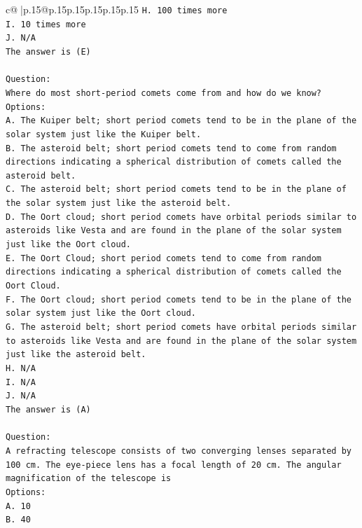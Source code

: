 \documentclass{article}
\begin{document}
{\begin{supertabular}{c@{$\;$}|p{.15\linewidth}@{}p{.15\linewidth}p{.15\linewidth}p{.15\linewidth}p{.15\linewidth}p{.15\linewidth}}
{{{\texttt{H. 100 times more} \\
\texttt{I. 10 times more} \\
\texttt{J. N/A} \\
\texttt{The answer is (E)} \\
\\ 
\texttt{Question:} \\
\texttt{Where do most short{-}period comets come from and how do we know?} \\
\texttt{Options:} \\
\texttt{A. The Kuiper belt; short period comets tend to be in the plane of the solar system just like the Kuiper belt.} \\
\texttt{B. The asteroid belt; short period comets tend to come from random directions indicating a spherical distribution of comets called the asteroid belt.} \\
\texttt{C. The asteroid belt; short period comets tend to be in the plane of the solar system just like the asteroid belt.} \\
\texttt{D. The Oort cloud; short period comets have orbital periods similar to asteroids like Vesta and are found in the plane of the solar system just like the Oort cloud.} \\
\texttt{E. The Oort Cloud; short period comets tend to come from random directions indicating a spherical distribution of comets called the Oort Cloud.} \\
\texttt{F. The Oort cloud; short period comets tend to be in the plane of the solar system just like the Oort cloud.} \\
\texttt{G. The asteroid belt; short period comets have orbital periods similar to asteroids like Vesta and are found in the plane of the solar system just like the asteroid belt.} \\
\texttt{H. N/A} \\
\texttt{I. N/A} \\
\texttt{J. N/A} \\
\texttt{The answer is (A)} \\
\\ 
\texttt{Question:} \\
\texttt{A refracting telescope consists of two converging lenses separated by 100 cm. The eye{-}piece lens has a focal length of 20 cm. The angular magnification of the telescope is} \\
\texttt{Options:} \\
\texttt{A. 10} \\
\texttt{B. 40} \\
}}}
\end{supertabular}}
\end{document}
